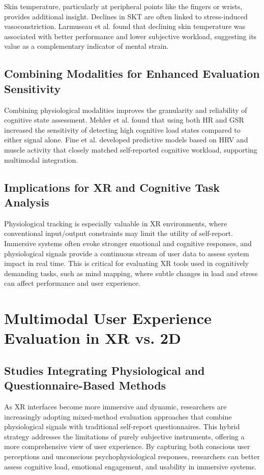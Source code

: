 \documentclass{CPP}
\begin{document}
Skin temperature, particularly at peripheral points like the fingers or wrists, provides additional insight. Declines in SKT are often linked to stress-induced vasoconstriction. Larmuseau et al. \citep{Larmuseau2020} found that declining skin temperature was associated with better performance and lower subjective workload, suggesting its value as a complementary indicator of mental strain.

\subsection{Combining Modalities for Enhanced Evaluation Sensitivity}

Combining physiological modalities improves the granularity and reliability of cognitive state assessment. Mehler et al. \citep{Mehler2012} found that using both HR and GSR increased the sensitivity of detecting high cognitive load states compared to either signal alone. Fine et al. \citep{Fine2022} developed predictive models based on HRV and muscle activity that closely matched self-reported cognitive workload, supporting multimodal integration.

\subsection{Implications for XR and Cognitive Task Analysis}

Physiological tracking is especially valuable in XR environments, where conventional input/output constraints may limit the utility of self-report. Immersive systems often evoke stronger emotional and cognitive responses, and physiological signals provide a continuous stream of user data to assess system impact in real time. This is critical for evaluating XR tools used in cognitively demanding tasks, such as mind mapping, where subtle changes in load and stress can affect performance and user experience.



\section{Multimodal User Experience Evaluation in XR vs. 2D}

\subsection{Studies Integrating Physiological and Questionnaire-Based Methods}

As XR interfaces become more immersive and dynamic, researchers are increasingly adopting mixed-method evaluation approaches that combine physiological signals with traditional self-report questionnaires. This hybrid strategy addresses the limitations of purely subjective instruments, offering a more comprehensive view of user experience. By capturing both conscious user perceptions and unconscious psychophysiological responses, researchers can better assess cognitive load, emotional engagement, and usability in immersive systems.
\end{document}
